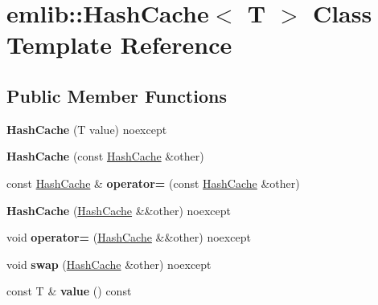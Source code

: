 \hypertarget{classemlib_1_1_hash_cache}{\section{emlib\+:\+:Hash\+Cache$<$ T $>$ Class Template Reference}
\label{classemlib_1_1_hash_cache}
}
\subsection*{Public Member Functions}
\begin{DoxyCompactItemize}
\item 
\hypertarget{classemlib_1_1_hash_cache_acce90fa618647c2c464b56468d23cff2}{{\bfseries Hash\+Cache} (T value) noexcept}\label{classemlib_1_1_hash_cache_acce90fa618647c2c464b56468d23cff2}

\item 
\hypertarget{classemlib_1_1_hash_cache_a019a85ece3d82188294111136f7be30a}{{\bfseries Hash\+Cache} (const \hyperlink{classemlib_1_1_hash_cache}{Hash\+Cache} \&other)}\label{classemlib_1_1_hash_cache_a019a85ece3d82188294111136f7be30a}

\item 
\hypertarget{classemlib_1_1_hash_cache_aec55ab03819f689c872444c2f26b7fc0}{const \hyperlink{classemlib_1_1_hash_cache}{Hash\+Cache} \& {\bfseries operator=} (const \hyperlink{classemlib_1_1_hash_cache}{Hash\+Cache} \&other)}\label{classemlib_1_1_hash_cache_aec55ab03819f689c872444c2f26b7fc0}

\item 
\hypertarget{classemlib_1_1_hash_cache_a739386ddac28545eca33cf5aba57c7b6}{{\bfseries Hash\+Cache} (\hyperlink{classemlib_1_1_hash_cache}{Hash\+Cache} \&\&other) noexcept}\label{classemlib_1_1_hash_cache_a739386ddac28545eca33cf5aba57c7b6}

\item 
\hypertarget{classemlib_1_1_hash_cache_aa17dc26e6e38df3a4b8a4b6a41335e94}{void {\bfseries operator=} (\hyperlink{classemlib_1_1_hash_cache}{Hash\+Cache} \&\&other) noexcept}\label{classemlib_1_1_hash_cache_aa17dc26e6e38df3a4b8a4b6a41335e94}

\item 
\hypertarget{classemlib_1_1_hash_cache_a537a0fa4037486592a50e39c14d5c21a}{void {\bfseries swap} (\hyperlink{classemlib_1_1_hash_cache}{Hash\+Cache} \&other) noexcept}\label{classemlib_1_1_hash_cache_a537a0fa4037486592a50e39c14d5c21a}

\item 
\hypertarget{classemlib_1_1_hash_cache_a6e8ca5518c9502cf31f8a488ab1de0a3}{const T \& {\bfseries value} () const }\label{classemlib_1_1_hash_cache_a6e8ca5518c9502cf31f8a488ab1de0a3}


\end{DoxyCompactItemize}
